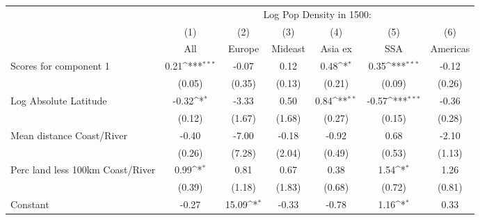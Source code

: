 {
\def\sym#1{\ifmmode^{#1}\else\(^{#1}\)\fi}
\begin{tabular}{l*{6}{c}}
\toprule
                    &\multicolumn{6}{c}{Log Pop Density in 1500:}                                                                                       \\
                    &\multicolumn{1}{c}{(1)}         &\multicolumn{1}{c}{(2)}         &\multicolumn{1}{c}{(3)}         &\multicolumn{1}{c}{(4)}         &\multicolumn{1}{c}{(5)}         &\multicolumn{1}{c}{(6)}         \\
                    &         All         &      Europe         &     Mideast         &     Asia ex         &         SSA         &    Americas         \\
\midrule
Scores for component 1&        0.21\sym{***}&       -0.07         &        0.12         &        0.48\sym{*}  &        0.35\sym{***}&       -0.12         \\
                    &      (0.05)         &      (0.35)         &      (0.13)         &      (0.21)         &      (0.09)         &      (0.26)         \\
\addlinespace
Log Absolute Latitude&       -0.32\sym{*}  &       -3.33         &        0.50         &        0.84\sym{**} &       -0.57\sym{***}&       -0.36         \\
                    &      (0.12)         &      (1.67)         &      (1.68)         &      (0.27)         &      (0.15)         &      (0.28)         \\
\addlinespace
Mean distance Coast/River&       -0.40         &       -7.00         &       -0.18         &       -0.92         &        0.68         &       -2.10         \\
                    &      (0.26)         &      (7.28)         &      (2.04)         &      (0.49)         &      (0.53)         &      (1.13)         \\
\addlinespace
Perc land less 100km Coast/River&        0.99\sym{*}  &        0.81         &        0.67         &        0.38         &        1.54\sym{*}  &        1.26         \\
                    &      (0.39)         &      (1.18)         &      (1.83)         &      (0.68)         &      (0.72)         &      (0.81)         \\
\addlinespace
Constant            &       -0.27         &       15.09\sym{*}  &       -0.33         &       -0.78         &        1.16\sym{*}  &        0.33         \\

\end{tabular}}
